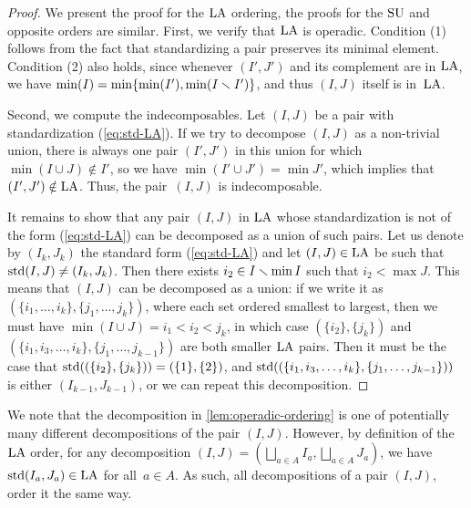 \begin{proof}
We present the proof for the $\mathrm{LA}$ ordering, the proofs for the $\mathrm{SU}$ and opposite orders are similar.
First, we verify that $\mathrm{LA}$ is operadic. 
Condition (1) follows from the fact that standardizing a pair preserves its minimal element.
Condition (2) also holds, since whenever $(I',J')$ and its complement are in $\mathrm{LA}$, we have $\min(I)=\min\{\min(I'),\min(I\smallsetminus I')\}$, and thus $(I,J)$ itself is in~$\mathrm{LA}$.

Second, we compute the indecomposables. 
Let $(I,J)$ be a pair with standardization (\ref{eq:std-LA}).
If we try to decompose $(I,J)$ as a non-trivial union, there is always one pair $(I',J')$ in this union for which~$\min (I\cup J) \notin I'$, so we have $\min ( I' \cup J') = \min J'$, which implies that $(I',J') \notin \mathrm{LA}$.
Thus, the pair~$(I,J)$ is indecomposable. 

It remains to show that any pair $(I,J)$ in $\mathrm{LA}$ whose standardization is not of the form (\ref{eq:std-LA}) can be decomposed as a union of such pairs. 
Let us denote by $(I_k,J_k)$ the standard form (\ref{eq:std-LA}) and let $(I,J)\in \mathrm{LA}$ be such that $\operatorname{std}(I,J) \neq (I_k,J_k)$.
Then there exists $i_2 \in I\smallsetminus \min I$ such that $i_2 < \max J$.
This means that $(I,J)$ can be decomposed as a union: if we write it as $(\{i_1,\dots,i_k\},\{j_1,\dots,j_k\})$, where each set ordered smallest to largest, then we must have $\min (I\cup J)=i_1<i_2<j_k$, in which case $(\{i_2\},\{j_k\})$ and $(\{i_1,i_3,\dots,i_k\},\{j_1,\dots,j_{k-1}\})$ are both smaller $\mathrm{LA}$ pairs.
Then it must be the case that $\operatorname{std}((\{i_2\},\{j_k\})) = (\{1\},\{2\})$, and $\operatorname{std}((\{i_1,i_3,\dots,i_k\},\{j_1,\dots,j_{k-1}\}))$ is either $(I_{k-1},J_{k-1})$, or we can repeat this decomposition.
\end{proof}

\begin{remark}
We note that the decomposition in \cref{lem:operadic-ordering} is one of potentially many different decompositions of the pair $(I,J)$. 
However, by definition of the $\mathrm{LA}$ order, for any decomposition $(I,J) = (\bigsqcup_{a\in A} I_a, \bigsqcup_{a \in A} J_a)$, we have $\operatorname{std}(I_a, J_a) \in \mathrm{LA}$ for all~$a \in A$.
As such, all decompositions of a pair $(I,J)$, order it the same way.
\end{remark}


